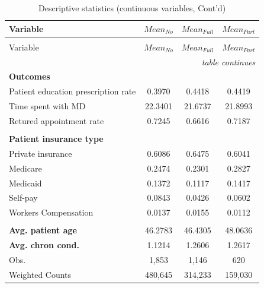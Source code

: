 \documentclass[12pt]{report}
\begin{document}
\newpage
{\footnotesize
\begin{center}
\label{tab:desc2}
\renewcommand*{\arraystretch}{0.6}
\begin{longtable}{lccc}
\caption{Descriptive statistics (continuous variables)}\\

\hline \hline
Variable   & $Mean_{No}$ & $Mean_{Full}$ & $Mean_{Part}$ \\ \hline \endfirsthead

\caption*{Descriptive statistics (continuous variables, Cont'd)}\\

\hline \hline
Variable   & $Mean_{No}$ & $Mean_{Full}$ & $Mean_{Part}$ \\ \hline \endhead

\hline  \multicolumn{4}{r}{\textit{table continues}}\\ \endfoot
\hline \hline  \endlastfoot

\textbf{Outcomes}                   &           &             &             \\
Patient education prescription rate & 0.3970    & 0.4418      & 0.4419      \\
Time spent with MD                  & 22.3401   & 21.6737     & 21.8993     \\
Retured appointment rate            & 0.7245    & 0.6616      & 0.7187      \\
                                    &           &             &             \\
\textbf{Patient insurance type}     &           &             &             \\
Private insurance                   & 0.6086    & 0.6475      & 0.6041      \\
Medicare                            & 0.2474    & 0.2301      & 0.2827      \\
Medicaid                            & 0.1372    & 0.1117      & 0.1417      \\
Self-pay                            & 0.0843    & 0.0426      & 0.0602      \\
Workers Compensation                & 0.0137    & 0.0155      & 0.0112      \\
                                    &           &             &             \\
\textbf{Avg. patient age}           & 46.2783   & 46.4305     & 48.0636     \\
\textbf{Avg. chron cond.}           & 1.1214    & 1.2606      & 1.2617      \\ 
Obs.                                & 1,853     & 1,146       & 620         \\
Weighted Counts                     & 480,645   & 314,233     & 159,030     \\
\end{longtable}
\end{center}}
\end{document}
